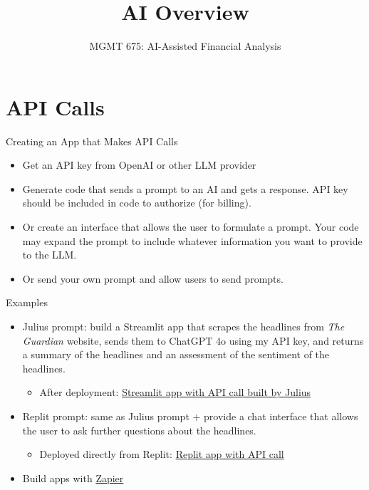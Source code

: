 \documentclass[10pt]{beamer}
\title{AI Overview}
\subtitle{MGMT 675: AI-Assisted Financial Analysis}
\date{}
\begin{document}
\begin{frame}[plain]
\titlepage
\end{frame}

\section{API Calls}
\begin{frame}{Creating an App that Makes API Calls}
\begin{itemize}
    \item Get an API key from OpenAI or other LLM provider
\item Generate code that sends a prompt to an AI and gets a response.  API key should be included in code to authorize (for billing).
\item Or create an interface that allows the user to formulate a prompt.  Your code may expand the prompt to include whatever information you want to provide to the LLM.
\item Or send your own prompt and allow users to send prompts.
\end{itemize}
\end{frame}

\begin{frame}{Examples}
    \begin{itemize}
        \item Julius prompt: build a Streamlit app that scrapes the headlines from \textit{The Guardian} website, sends them to ChatGPT 4o using my API key, and returns a summary of the headlines and an assessment of the sentiment of the headlines.
      \begin{itemize}
        \item After deployment: \href{https://mgmt675-app-kbhft94zmjfhfjqbdq9csf.streamlit.app/}{Streamlit app with API call built by Julius}
        \end{itemize}
        \item Replit prompt: same as Julius prompt + provide a chat interface that allows the user to ask further questions about the headlines.
        \begin{itemize}
        \item Deployed directly from Replit: \href{https://guardian-pulse-kerryback.replit.app/}{Replit app with API call}
        \end{itemize}
        \item Build apps with \href{https://zapier.com/blog/categories/zapier-automation/}{Zapier}
    \end{itemize}
    \end{frame}
\end{document}
